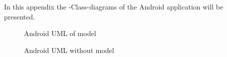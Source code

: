 \label{chap:and_appendix}

In this appendix the -Class-diagrams of the Android application will be
presented. 

\begin{figure}[h]
    \caption{Android UML of model}
    \label{fig:and_umlmodel}
\end{figure}  
\begin{figure}[h]	
    \caption{Android UML without model}
    \label{fig:and_uml}
\end{figure}  
\FloatBarrier

